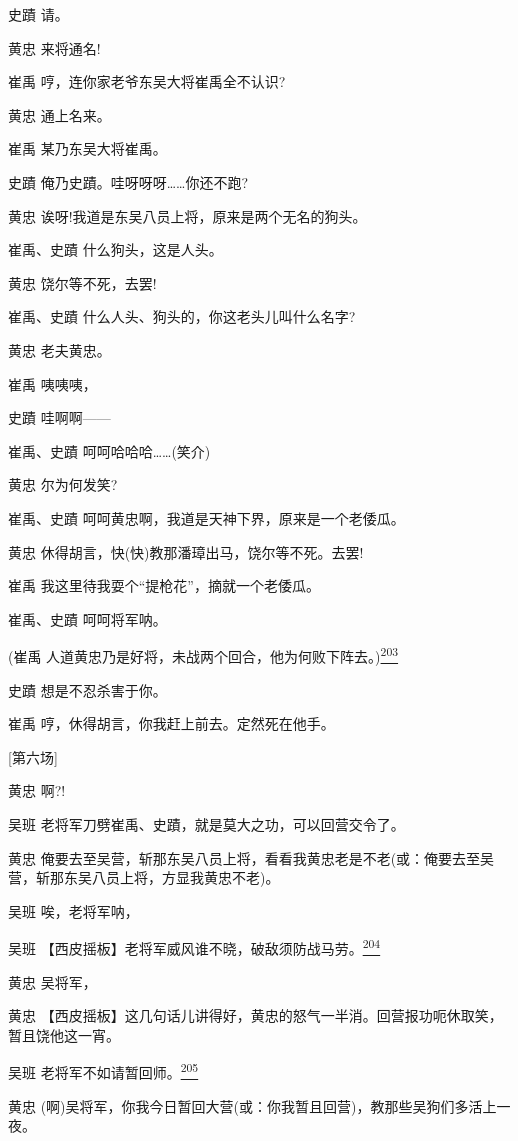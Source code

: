 史蹟 请。

黄忠 来将通名!

崔禹 哼，连你家老爷东吴大将崔禹全不认识?

黄忠 通上名来。

崔禹 某乃东吴大将崔禹。

史蹟 俺乃史蹟。哇呀呀呀\ldots{}\ldots{}你还不跑?

黄忠 诶呀!我道是东吴八员上将，原来是两个无名的狗头。

崔禹、史蹟 什么狗头，这是人头。

黄忠 饶尔等不死，去罢!

崔禹、史蹟 什么人头、狗头的，你这老头儿叫什么名字?

黄忠 老夫黄忠。

崔禹 咦咦咦，

史蹟 哇啊啊------

崔禹、史蹟 呵呵哈哈哈\ldots{}\ldots{}(笑介)

黄忠 尔为何发笑?

崔禹、史蹟 呵呵黄忠啊，我道是天神下界，原来是一个老倭瓜。

黄忠 休得胡言，快(快)教那潘璋出马，饶尔等不死。去罢!

崔禹 我这里待我耍个``提枪花''，摘就一个老倭瓜。

崔禹、史蹟 呵呵将军呐。

(崔禹
人道黄忠乃是好将，未战两个回合，他为何败下阵去。)\protect\hyperlink{fn203}{\textsuperscript{203}}

史蹟 想是不忍杀害于你。

崔禹 哼，休得胡言，你我赶上前去。定然死在他手。

{[}第六场{]}

黄忠 啊?!

吴班 老将军刀劈崔禹、史蹟，就是莫大之功，可以回营交令了。

黄忠
俺要去至吴营，斩那东吴八员上将，看看我黄忠老是不老(或：俺要去至吴营，斩那东吴八员上将，方显我黄忠不老)。

吴班 唉，老将军呐，

吴班
【西皮摇板】老将军威风谁不晓，破敌须防战马劳。\protect\hyperlink{fn204}{\textsuperscript{204}}

黄忠 吴将军，

黄忠
【西皮摇板】这几句话儿讲得好，黄忠的怒气一半消。回营报功呃休取笑，暂且饶他这一宵。

吴班
老将军不如请暂回师。\protect\hyperlink{fn205}{\textsuperscript{205}}

黄忠
(啊)吴将军，你我今日暂回大营(或：你我暂且回营)，教那些吴狗们多活上一夜。

